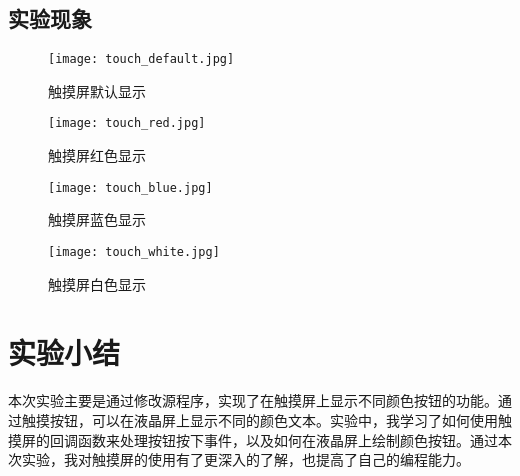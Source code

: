 \documentclass{math201}
\begin{document}
\subsection{实验现象}

\begin{figure}[H]
  \centering\texttt{[image: touch\_default.jpg]}
  \caption{触摸屏默认显示}
\end{figure}

\begin{figure}[H]
   \centering\texttt{[image: touch\_red.jpg]}
   \caption{触摸屏红色显示}
\end{figure}

\begin{figure}[H]
   \centering\texttt{[image: touch\_blue.jpg]}
   \caption{触摸屏蓝色显示}
\end{figure}

\begin{figure}[H]
   \centering\texttt{[image: touch\_white.jpg]}
   \caption{触摸屏白色显示}
 \end{figure}

\section{实验小结}

本次实验主要是通过修改源程序，实现了在触摸屏上显示不同颜色按钮的功能。通过触摸按钮，可以在液晶屏上显示不同的颜色文本。实验中，我学习了如何使用触摸屏的回调函数来处理按钮按下事件，以及如何在液晶屏上绘制颜色按钮。通过本次实验，我对触摸屏的使用有了更深入的了解，也提高了自己的编程能力。
\end{document}
